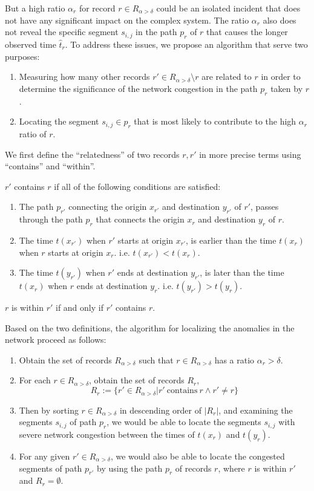 \documentclass{sig-alternate}
\begin{document}
But a high ratio $\alpha_r$ for record $r \in R_{\alpha > \delta}$ could be an isolated incident that does not have any significant impact on the complex system. The ratio $\alpha_r$ also does not reveal the specific segment $s_{i,j}$ in the path $p_r$ of $r$ that causes the longer observed time $\hat{t}_r$. To address these issues, we propose an algorithm that serve two purposes:
\begin{enumerate}
	\item Measuring how many other records $r' \in R_{\alpha > \delta}\setminus{r}$ are related to $r$ in order to determine the significance of the network congestion in the path $p_r$ taken by $r$.
	\item Locating the segment $s_{i,j} \in p_r$ that is most likely to contribute to the high $\alpha_r$ ratio of $r$.
\end{enumerate}
We first define the ``relatedness'' of two records $r, r'$ in more precise terms using ``contains'' and ``within''.
\begin{definition}
	$r'$ contains $r$ if all of the following conditions are satisfied: 
	\begin{enumerate}
		\item The path $p_{r'}$ connecting the origin $x_{r'}$ and destination $y_{r'}$ of $r'$, passes through the path $p_{r}$ that connects the origin $x_{r}$ and destination $y_{r}$ of $r$. 
		\item The time $t(x_{r'})$ when $r'$ starts at origin $x_{r'}$, is earlier than the time $t(x_{r})$ when $r$ starts at origin $x_{r}$. i.e. $t(x_{r'}) < t(x_{r})$.
		\item The time $t(y_{r'})$ when $r'$ ends at destination $y_{r'}$, is later than the time $t(x_{r})$ when $r$ ends at destination $y_{r}$. i.e. $t(y_{r'}) > t(y_{r})$.
	\end{enumerate}
\end{definition}
\begin{definition}
	$r$ is within $r'$ if and only if $r'$ contains $r$.
\end{definition}
Based on the two definitions, the algorithm for localizing the anomalies in the network proceed as follows:
\begin{enumerate}
	\item Obtain the set of records $R_{\alpha > \delta}$ such that $r \in R_{\alpha > \delta}$ has a ratio $\alpha_r > \delta$.
	\item For each $r \in R_{\alpha > \delta}$, obtain the set of records $R_r$,
	\[ R_{r} := \{ r' \in R_{\alpha > \delta} | r' ~ \text{contains} ~ r \land r' \neq r \} \]
	\item Then by sorting $r \in R_{\alpha > \delta}$ in descending order of $|R_r|$, and examining the segments $s_{i,j}$ of path $p_r$, we would be able to locate the segments $s_{i,j}$ with severe network congestion between the times of $t(x_r)$ and $t(y_r)$.
	\item For any given $r' \in R_{\alpha > \delta}$, we would also be able to locate the congested segments of path $p_{r'}$ by using the path $p_r$ of records $r$, where $r$ is within $r'$ and $R_r = \emptyset$.
\end{enumerate}
\end{document}
